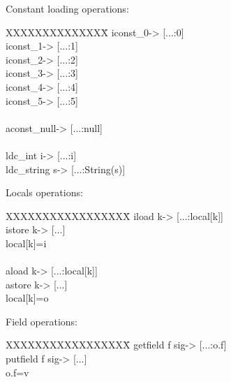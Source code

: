 \begin{slide*}
Constant loading operations:\\

\begin{tt}
\begin{tabbing}
XXXXXXXXXXXXXX\=\kill
iconst\_0\>[...] -> [...:0]\\
iconst\_1\>[...] -> [...:1]\\
iconst\_2\>[...] -> [...:2]\\
iconst\_3\>[...] -> [...:3]\\
iconst\_4\>[...] -> [...:4]\\
iconst\_5\>[...] -> [...:5]\\
\\
aconst\_null\>[...] -> [...:null]\\
\\
ldc\_int i\>[...] -> [...:i]\\
ldc\_string s\>[...] -> [...:String(s)]\\
\end{tabbing}
\end{tt}
\vfil
\end{slide*}

\begin{slide*}
Locals operations:\\

\begin{tt}
\begin{tabbing}
XXXXXXXXXXXXXXXXX\=\kill
iload k\>[...] -> [...:local[k]]\\
istore k\>[...:i] -> [...]\\
        \>local[k]=i\\
\\
aload k\>[...] -> [...:local[k]]\\
astore k\>[...:o] -> [...]\\
        \>local[k]=o\\
\end{tabbing}
\end{tt}

Field operations:\\

\begin{tt}
\begin{tabbing}
XXXXXXXXXXXXXXXXX\=\kill
getfield f sig\>[...:o] -> [...:o.f]\\
putfield f sig\>[...:o:v] -> [...]\\
              \>o.f=v\\
\end{tabbing}
\end{tt}
\vfil
\end{slide*}

